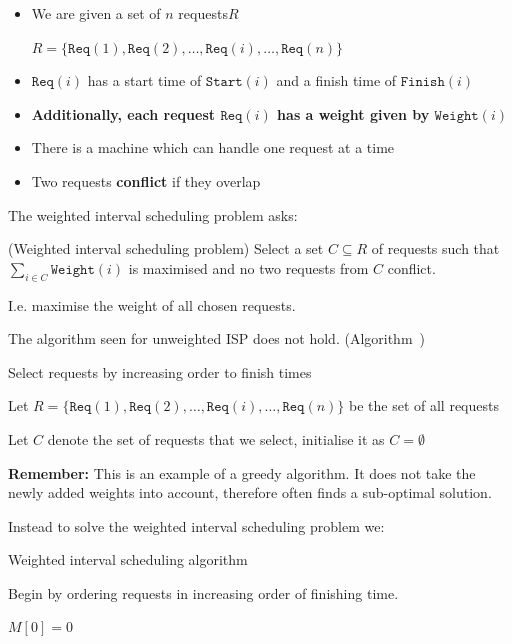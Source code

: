 \documentclass{article}
\begin{document}
\begin{itemize}
  \item We are given a set of $n$ requests$ R$ 

    $R = \{ \texttt{Req}(1), \texttt{Req}(2), \ldots, \texttt{Req}(i), \ldots, \texttt{Req}(n)\} $
  \item $\texttt{Req}(i)$ has a start time of $\texttt{Start} (i)$ and a finish time of $\texttt{Finish} (i)$
        \item \textbf{Additionally, each request $\texttt{Req}(i)$ has a weight given by $\texttt{Weight}(i)$}
  \item There is a machine which can handle one request at a time
  \item Two requests \textbf{conflict} if they overlap
\end{itemize}

The weighted interval scheduling problem asks:

\begin{problem}(Weighted interval scheduling problem)
  Select a set $C \subseteq R$ of requests such that $\sum_{i\in C}\texttt{Weight} (i)$ is maximised and no two requests from $C$ conflict.
\end{problem}

I.e. maximise the weight of all chosen requests.

The algorithm seen for unweighted ISP does not hold. (Algorithm~)

\begin{algorithm}
  \caption{Select requests by increasing order to finish times}
  Let $R = \{ \texttt{Req}(1), \texttt{Req}(2), \ldots, \texttt{Req}(i), \ldots, \texttt{Req}(n)\} $ be the set of all requests

  Let $C$ denote the set of requests that we select, initialise it as $C = \emptyset $

\end{algorithm}
\textbf{Remember: } This is an example of a greedy algorithm. It does not take the newly added weights into account, therefore often finds a sub-optimal solution.

Instead to solve the weighted interval scheduling problem we:

\begin{algorithm}
  \caption{Weighted interval scheduling algorithm}
  Begin by ordering requests in increasing order of finishing time.

  $M[0] = 0$

\end{algorithm}
\end{document}
